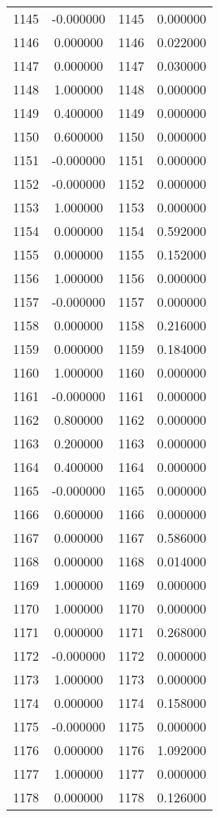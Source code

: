 \documentclass[12pt]{article}
\begin{document}
\begin{longtable}{@{}cccc@{}}
1145 & -0.000000 & 1145 & 0.000000 \\
1146 & 0.000000 & 1146 & 0.022000 \\
1147 & 0.000000 & 1147 & 0.030000 \\
1148 & 1.000000 & 1148 & 0.000000 \\
1149 & 0.400000 & 1149 & 0.000000 \\
1150 & 0.600000 & 1150 & 0.000000 \\
1151 & -0.000000 & 1151 & 0.000000 \\
1152 & -0.000000 & 1152 & 0.000000 \\
1153 & 1.000000 & 1153 & 0.000000 \\
1154 & 0.000000 & 1154 & 0.592000 \\
1155 & 0.000000 & 1155 & 0.152000 \\
1156 & 1.000000 & 1156 & 0.000000 \\
1157 & -0.000000 & 1157 & 0.000000 \\
1158 & 0.000000 & 1158 & 0.216000 \\
1159 & 0.000000 & 1159 & 0.184000 \\
1160 & 1.000000 & 1160 & 0.000000 \\
1161 & -0.000000 & 1161 & 0.000000 \\
1162 & 0.800000 & 1162 & 0.000000 \\
1163 & 0.200000 & 1163 & 0.000000 \\
1164 & 0.400000 & 1164 & 0.000000 \\
1165 & -0.000000 & 1165 & 0.000000 \\
1166 & 0.600000 & 1166 & 0.000000 \\
1167 & 0.000000 & 1167 & 0.586000 \\
1168 & 0.000000 & 1168 & 0.014000 \\
1169 & 1.000000 & 1169 & 0.000000 \\
1170 & 1.000000 & 1170 & 0.000000 \\
1171 & 0.000000 & 1171 & 0.268000 \\
1172 & -0.000000 & 1172 & 0.000000 \\
1173 & 1.000000 & 1173 & 0.000000 \\
1174 & 0.000000 & 1174 & 0.158000 \\
1175 & -0.000000 & 1175 & 0.000000 \\
1176 & 0.000000 & 1176 & 1.092000 \\
1177 & 1.000000 & 1177 & 0.000000 \\
1178 & 0.000000 & 1178 & 0.126000 \\

\end{longtable}
\end{document}
